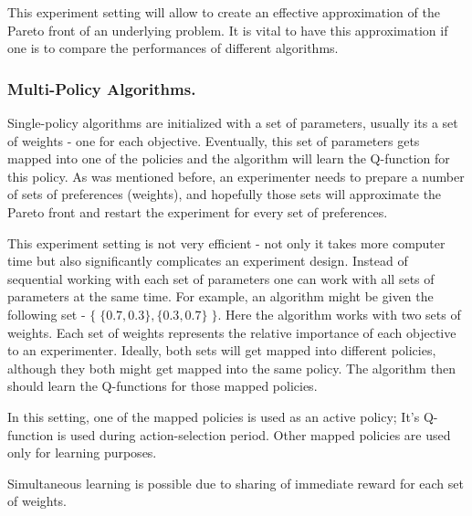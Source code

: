 This experiment setting will allow to create an effective approximation of the Pareto front of an underlying problem. It is vital to have this approximation if one is to compare the performances of different algorithms.

\subsubsection{Multi-Policy Algorithms.}

Single-policy algorithms are initialized with a set of parameters, usually its a set of weights - one for each objective. Eventually, this set of parameters gets mapped into one of the policies and the algorithm will learn the Q-function for this policy. As was mentioned before, an experimenter needs to prepare a number of sets of preferences (weights), and hopefully those sets will approximate the Pareto front and restart the experiment for every set of preferences. 

This experiment setting is not very efficient - not only it takes more computer time but also significantly complicates an experiment design. Instead of sequential working with each set of parameters one can work with all sets of parameters at the same time. For example, an algorithm might be given the following set - $ \{\;\{0.7,0.3\}, \{0.3,0.7\}\;\} $. Here the algorithm works with two sets of weights. Each set of weights represents the relative importance of each objective to an experimenter. Ideally, both sets will get mapped into different policies, although they both might get mapped into the same policy.  The algorithm then should learn the Q-functions for those mapped policies.

In this setting, one of the mapped policies is used as an active policy; It's Q-function is used during action-selection period. Other mapped policies are used only for learning purposes.

Simultaneous learning is possible due to sharing of immediate reward for each set of weights.


